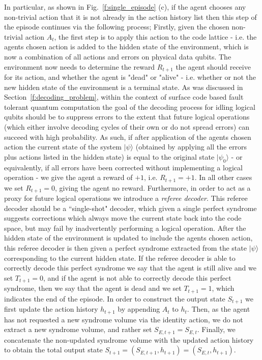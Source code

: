 \documentclass[twocolumn,preprintnumbers,amsmath,amssymb,notitlepage,nofootinbib,longbibliography,superscriptaddress,aps,pra,10pt]{revtex4-1}
\begin{document}
	In particular, as shown in Fig.~\ref{f:single_episode} (c), if the agent chooses any non-trivial action that it is not already in the action history list then this step of the episode continues via the following process; 
	Firstly, given the chosen non-trivial action $A_t$, the first step is to apply this action to the code lattice - i.e. the agents chosen action is added to the hidden state of the environment, which is now a combination of all actions and errors on physical data qubits.
	The environment now needs to determine the reward $R_{t+1}$ the agent should receive for its action, and whether the agent is "dead" or "alive" - i.e. whether or not the new hidden state of the environment is a terminal state.
	As was discussed in Section~\ref{f:decoding_problem}, within the context of surface code based fault tolerant quantum computation the goal of the decoding process for idling logical qubits should be to suppress errors to the extent that future logical operations (which either involve decoding cycles of their own or do not spread errors) can succeed with high probability.
	As such, if after application of the agents chosen action the current state of the system $|\psi\rangle$ (obtained by applying all the errors plus actions listed in the hidden state) is equal to the original state $|\psi_0\rangle$ - or equivalently, if all errors have been corrected without implementing a logical operation - we give the agent a reward of $+1$, i.e. $R_{t+1} = +1$.
	In all other cases we set $R_{t+1} = 0$, giving the agent no reward.
	Furthermore, in order to act as a proxy for future logical operations we introduce a \textit{referee decoder}.
	This referee decoder should be a ``single-shot" decoder, which given a single perfect syndrome suggests corrections which always move the current state back into the code space, but may fail by inadvertently performing a logical operation.
	After the hidden state of the environment is updated to include the agents chosen action, this referee decoder is then given a perfect syndrome extracted from the state $|\psi\rangle$ corresponding to the current hidden state.
	If the referee decoder is able to correctly decode this perfect syndrome we say that the agent is still alive and we set $T_{t+1} = 0$, and if the agent is not able to correctly decode this perfect syndrome, then we say that the agent is dead and we set $T_{t+1}=1$, which indicates the end of the episode.
	In order to construct the output state $S_{t+1}$ we first update the action history $h_{t+1}$ by appending $A_t$ to $h_t$.
	Then, as the agent has not requested a new syndrome volume via the identity action, we do not extract a new syndrome volume, and rather set $S_{E,{t+1}} = S_{E,t}$.
	Finally, we concatenate the non-updated syndrome volume with the updated action history to obtain the total output state $S_{t+1} = (S_{E,t+1},h_{t+1}) = (S_{E,t},h_{t+1})$.
\end{document}
